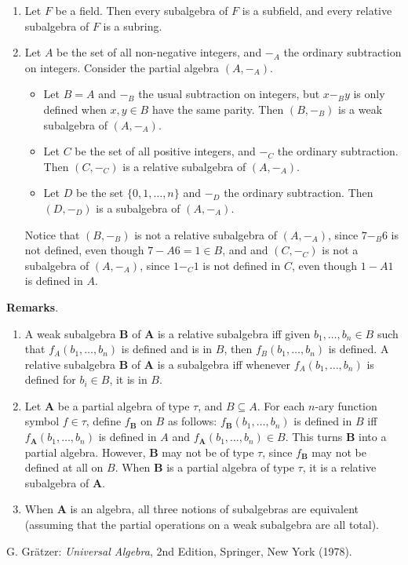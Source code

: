 \documentclass[12pt]{article}
\begin{document}
\begin{enumerate}
\item  Let $F$ be a field.  Then every subalgebra of $F$ is a subfield, and every relative subalgebra of $F$ is a subring.
\item
Let $A$ be the set of all non-negative integers, and $-_A$ the ordinary subtraction on integers.  Consider the partial algebra $(A, -_A)$.
\begin{itemize}
\item Let $B=A$ and $-_B$ the usual subtraction on integers, but $x-_B y$ is only defined when $x,y\in B$ have the same parity.  Then $(B, -_B)$ is a weak subalgebra of $(A, -_A)$.  
\item Let $C$ be the set of all positive integers, and $-_C$ the ordinary subtraction.  Then $(C,-_C)$ is a relative subalgebra of $(A,-_A)$.  
\item Let $D$ be the set $\lbrace 0,1,\ldots, n\rbrace$ and $-_D$ the ordinary subtraction.  Then $(D,-_D)$ is a subalgebra of $(A,-_A)$.
\end{itemize}
Notice that $(B,-_B)$ is not a relative subalgebra of $(A,-_A)$, since $7-_B 6$ is not defined, even though $7 -A 6 = 1\in B$, and and $(C,-_C)$ is not a subalgebra of $(A,-_A)$, since $1 -_C 1$ is not defined in $C$, even though $1 -A 1$ is defined in $A$.
\end{enumerate}

\textbf{Remarks}.  
\begin{enumerate}
\item
A weak subalgebra $\boldsymbol{B}$ of $\boldsymbol{A}$ is a relative subalgebra iff given $b_1,\ldots, b_n\in B$ such that $f_A(b_1,\ldots, b_n)$ is defined and is in $B$, then $f_B(b_1,\ldots, b_n)$ is defined.  A relative subalgebra $\boldsymbol{B}$ of $\boldsymbol{A}$ is a subalgebra iff whenever $f_A(b_1,\ldots, b_n)$ is defined for $b_i\in B$, it is in $B$.
\item
Let $\boldsymbol{A}$ be a partial algebra of type $\tau$, and $B\subseteq A$.  For each $n$-ary function symbol $f\in \tau$, define $f_{\boldsymbol{B}}$ on $B$ as follows: $f_{\boldsymbol{B}}(b_1,\ldots, b_n)$ is defined in $B$ iff $f_{\boldsymbol{A}}(b_1,\ldots, b_n)$ is defined in $A$ and $f_{\boldsymbol{A}}(b_1,\ldots, b_n)\in B$.  This turns $\boldsymbol{B}$ into a partial algebra.  However, $\boldsymbol{B}$ may not be of type $\tau$, since $f_{\boldsymbol{B}}$ may not be defined at all on $B$.  When $\boldsymbol{B}$ is a partial algebra of type $\tau$, it is a relative subalgebra of $\boldsymbol{A}$.
\item
When $\boldsymbol{A}$ is an algebra, all three notions of subalgebras are equivalent (assuming that the partial operations on a weak subalgebra are all total).
\end{enumerate}

\begin{thebibliography}{7}
 G. Gr\"{a}tzer: {\em Universal Algebra}, 2nd Edition, Springer, New York (1978).
\end{thebibliography}
\end{document}
